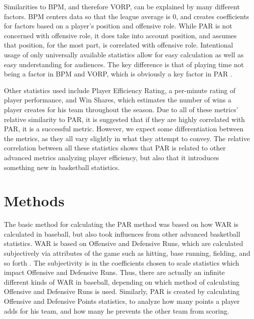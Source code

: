 \documentclass[titlepage, 12pt]{article}
\begin{document}
Similarities to BPM, and therefore VORP, can be explained by many 
different factors. BPM centers data so that the league average is 0, and 
creates coefficients for factors based on a player's position and offensive 
role. While PAR is not concerned with offensive role, it does take into 
account position, and assumes that position, for the most part, is 
correlated with offensive role. Intentional usage of only universally 
available statistics allow for easy calculation as well as easy 
understanding for audiences. The key difference is that of playing time not 
being a factor in BPM and VORP, which is obviously a key factor in PAR 
\citep{BasketballReferenceBPM}.

Other statistics used include Player Efficiency Rating, a 
per-minute rating of player performance, and Win Shares, which 
estimates the number of wins a player creates 
for his team throughout the season. Due to all of these metrics' relative 
similarity to PAR, it is suggested 
that if they are highly correlated with PAR, it is a successful metric. 
However, we expect some differentiation 
between the metrics, as they all vary slightly in what they attempt to 
convey. The relative correlation 
between all these statistics shows that PAR is related to other advanced 
metrics analyzing player efficiency, 
but also that it introduces something new in basketball statistics.



\section{Methods}

The basic method for calculating the PAR method was based on how 
WAR is calculated in baseball, but 
also took influences from other advanced basketball statistics. WAR is 
based on Offensive and Defensive 
Runs, which are calculated subjectively via attributes of the game such as 
hitting, base running, fielding, 
and so forth \citep{BaseballWAR}. The subjectivity is in the coefficients 
chosen to scale 
statistics which impact Offensive and 
Defensive Runs. Thus, there are actually an infinite different kinds of WAR 
in baseball, depending on which 
method of calculating Offensive and Defensive Runs is used. Similarly, 
PAR is created by calculating 
Offensive and Defensive Points statistics, to analyze how many points a 
player adds for his team, and how 
many he prevents the other team from scoring. 
\end{document}
